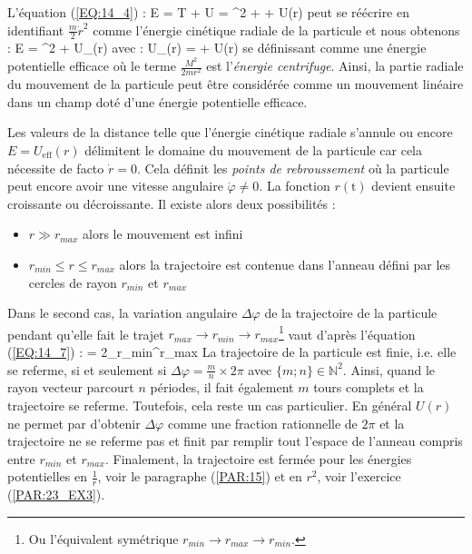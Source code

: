 L'\'equation (\ref{EQ:14_4}) :
\benn
	E = T + U = ^{2} +  + U(r)
\eenn
peut se r\'e\'ecrire en identifiant $\frac{m}{2}\dot{r}^{2}$ comme l'\'energie cin\'etique radiale de la particule et nous obtenons :
\benn
	E = ^{2} + U_{}(r)
\eenn
avec :
\be
	U_{}(r) =  + U(r) \label{EQ:14_8}
\ee
se d\'efinissant comme une \'energie potentielle efficace o\`u le terme $\frac{M^{2}}{2mr^{2}}$ est l'\emph{\'energie centrifuge}. Ainsi, la partie radiale du mouvement de la particule peut \^etre consid\'er\'ee comme un mouvement lin\'eaire dans un champ dot\'e d'une \'energie potentielle efficace.

Les valeurs de la distance telle que l'\'energie cin\'etique radiale s'annule ou encore $E = U_{\mathrm{eff}}(r)$ d\'elimitent le domaine du mouvement de la particule car cela n\'ecessite de facto $\dot{r} = 0$. Cela d\'efinit les \emph{points de rebroussement} o\`u la particule peut encore avoir une vitesse angulaire $\dot{\varphi}\neq 0$. La fonction $r(\mathrm{t})$ devient ensuite croissante ou d\'ecroissante. Il existe alors deux possibilit\'es :
\begin{itemize}
	\item $r \gg r_{max}$ alors le mouvement est infini
	\item $r_{min} \leqslant r \leqslant r_{max}$ alors la trajectoire est contenue dans l'anneau d\'efini par les cercles de rayon $r_{min}$ et $r_{max}$
\end{itemize}
Dans le second cas, la variation angulaire $\Delta\varphi$ de la trajectoire de la particule pendant qu'elle fait le trajet $r_{max} \rightarrow r_{min} \rightarrow r_{max}$\footnote{Ou l'\'equivalent sym\'etrique $r_{min} \rightarrow r_{max} \rightarrow r_{min}$.} vaut d'apr\`es l'\'equation (\ref{EQ:14_7}) :
\be
	\Delta\varphi = 2\bigintsss_{r_{min}}^{r_{max}}{} \label{EQ:14_10}
\ee
La trajectoire de la particule est finie, i.e. elle se referme, si et seulement si $\Delta\varphi = \frac{m}{n}\times 2\pi$ avec $\{m;n\}\in\mathbb{N}^{2}$. Ainsi, quand le rayon vecteur parcourt $n$ p\'eriodes, il fait \'egalement $m$ tours complets et la trajectoire se referme. Toutefois, cela reste un cas particulier. En g\'en\'eral $U(r)$ ne permet par d'obtenir $\Delta\varphi$ comme une fraction rationnelle de $2\pi$ et la trajectoire ne se referme pas et finit par remplir tout l'espace de l'anneau compris entre $r_{min}$ et $r_{max}$. Finalement, la trajectoire est ferm\'ee pour les \'energies potentielles en $\frac{1}{r}$, voir le paragraphe (\ref{PAR:15}) et en $r^{2}$, voir l'exercice (\ref{PAR:23_EX3}).


